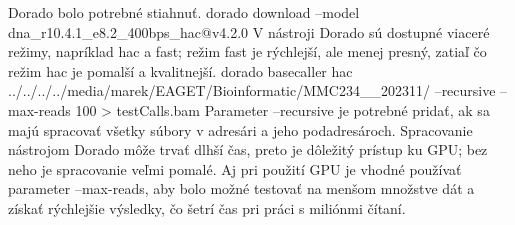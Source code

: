 


Dorado bolo potrebné stiahnuť.
dorado download --model dna_r10.4.1_e8.2_400bps_hac@v4.2.0
V nástroji Dorado sú dostupné viaceré režimy, napríklad hac a fast; režim fast je rýchlejší, ale menej presný, zatiaľ čo režim hac je pomalší a kvalitnejší.
dorado basecaller hac ../../../../media/marek/EAGET/Bioinformatic/MMC234__202311/ --recursive --max-reads 100 > testCalls.bam
Parameter --recursive je potrebné pridať, ak sa majú spracovať všetky súbory v adresári a jeho podadresároch.
Spracovanie nástrojom Dorado môže trvať dlhší čas, preto je dôležitý prístup ku GPU; bez neho je spracovanie veľmi pomalé. Aj pri použití GPU je vhodné používať parameter --max-reads, aby bolo možné testovať na menšom množstve dát a získať rýchlejšie výsledky, čo šetrí čas pri práci s miliónmi čítaní.



